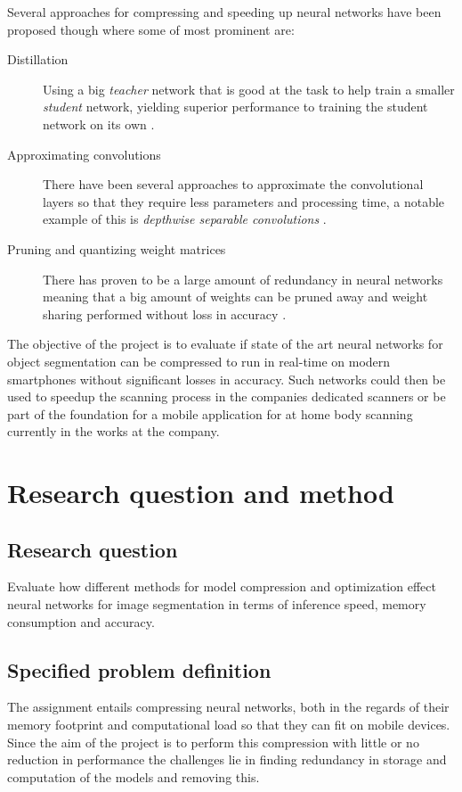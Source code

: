 \documentclass[11pt]{article}
\newcommand{\bibentry}[1]{\cite{#1}}
\begin{document}
Several approaches for compressing and speeding up neural networks have been proposed though where some of most prominent are: 
\begin{description}
\item[{Distillation}] Using a big \emph{teacher} network that is good at the task to help train a smaller \emph{student} network, yielding superior performance to training the student network on its own \bibentry{bucilua2006model}.
\item[{Approximating convolutions}] There have been several approaches to approximate the convolutional layers so that they require less parameters and processing time, a notable example of this is \emph{depthwise separable convolutions} \bibentry{howard2017mobilenets}.
\item[{Pruning and quantizing weight matrices}] There has proven to be a large amount of redundancy in neural networks meaning that a big amount of weights can be pruned away and weight sharing performed without loss in accuracy \bibentry{denil2013predicting}.
\end{description}

The objective of the project is to evaluate if state of the art neural networks for object segmentation can be compressed to run in real-time on modern smartphones without significant losses in accuracy. Such networks could then be used to speedup the scanning process in the companies dedicated scanners or be part of the foundation for a mobile application for at home body scanning currently in the works at the company.


\section{Research question and method}
\label{sec:org5239a67}
\subsection{Research question}
\label{sec:orgce3994b}
Evaluate how different methods for model compression and optimization effect neural networks for image segmentation in terms of inference speed, memory consumption and accuracy.

\subsection{Specified problem definition}
\label{sec:org6042100}
The assignment entails compressing neural networks, both in the regards of their memory footprint and computational load so that they can fit on mobile devices. Since the aim of the project is to perform this compression with little or no reduction in performance the challenges lie in finding redundancy in storage and computation of the models and removing this.
\end{document}
